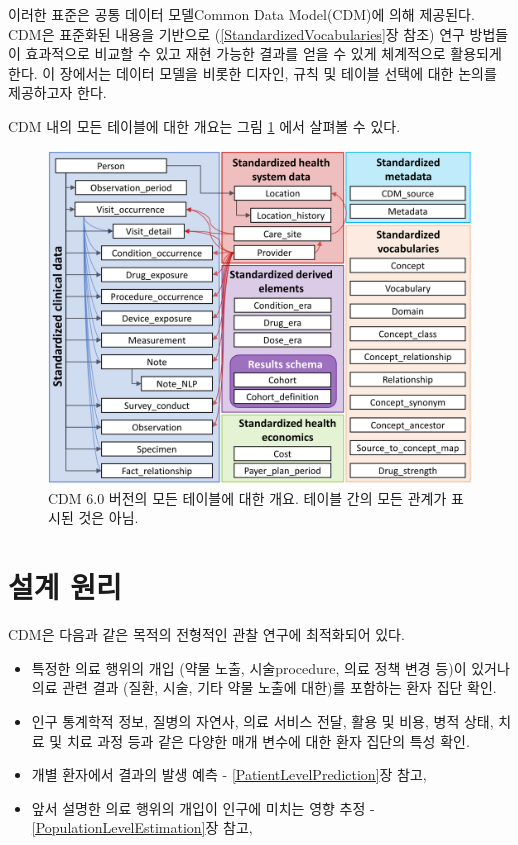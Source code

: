 \documentclass[11pt]{book}
\providecommand{\tightlist}{%
  \setlength{\itemsep}{0pt}\setlength{\parskip}{0pt}}
\theoremstyle{definition}
\theoremstyle{definition}
\theoremstyle{definition}
\theoremstyle{remark}
\begin{document}
이러한 표준은 공통 데이터 모델Common Data Model(CDM)에 의해 제공된다.
CDM은 표준화된 내용을 기반으로 (\ref{StandardizedVocabularies}장 참조)
연구 방법들이 효과적으로 비교할 수 있고 재현 가능한 결과를 얻을 수 있게
체계적으로 활용되게 한다. 이 장에서는 데이터 모델을 비롯한 디자인, 규칙
및 테이블 선택에 대한 논의를 제공하고자 한다.

CDM 내의 모든 테이블에 대한 개요는 그림 \ref{fig:cdmDiagram}
에서 살펴볼 수 있다.

\begin{figure}
\includegraphics[width=1\linewidth]{images/CommonDataModel/cdmDiagram} \caption{CDM 6.0 버전의 모든 테이블에 대한 개요. 테이블 간의 모든 관계가 표시된 것은 아님.}\label{fig:cdmDiagram}
\end{figure}

\section{설계 원리}\label{-}

CDM은 다음과 같은 목적의 전형적인 관찰 연구에 최적화되어
있다.

\begin{itemize}
\tightlist
\item
  특정한 의료 행위의 개입 (약물 노출, 시술procedure, 의료 정책 변경
  등)이 있거나 의료 관련 결과 (질환, 시술, 기타 약물 노출에 대한)를
  포함하는 환자 집단 확인.
\item
  인구 통계학적 정보, 질병의 자연사, 의료 서비스 전달, 활용 및 비용,
  병적 상태, 치료 및 치료 과정 등과 같은 다양한 매개 변수에 대한 환자
  집단의 특성 확인.
\item
  개별 환자에서 결과의 발생 예측 - \ref{PatientLevelPrediction}장 참고,
\item
  앞서 설명한 의료 행위의 개입이 인구에 미치는 영향 추정 -
  \ref{PopulationLevelEstimation}장 참고,
\end{itemize}
\end{document}

